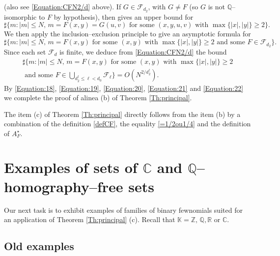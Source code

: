 \documentclass[10pt]{article}
\theoremstyle{definition}
\numberwithin{equation}{section}
\newcommand {\Q}{{\mathbb{Q}}}
\newcommand {\C}{{\mathbb{C}}}
\newcommand {\R}{{\mathbb{R}}}
\newcommand {\Z}{{\mathbb{Z}}}
\newcommand {\K}{{\mathbb{K}}}
\begin{document}
(also see \eqref{Equation:CFN2/d} above). 
If $G \in \mathcal F_{d_2}$, with $G\neq F$ (so $G$ is not $\Q$--isomorphic to $F$ by hypothesis), then \cite[Theorem 1.1]{FW2} gives an upper bound for
\begin{equation}\label{Equation:21}
\sharp \{ m : \vert m \vert \leqslant N, \, m=F(x,y) =G(u,v)\text{ for some } (x,y,u,v) \text{ with } \max \{ \vert x \vert, \vert y \vert \} \geqslant 2\}. \end{equation}
We then apply the inclusion--exclusion principle to give an asymptotic formula for 
\[
\sharp \{ m : \vert m \vert \leqslant N, \, m=F(x,y) \text{ for some } (x,y) \text{ with } \max \{ \vert x \vert, \vert y \vert \} \geqslant 2 \text{ and some } F \in \mathcal F_{d_2}\}.
\]
Since each set $\mathcal F_d$ is finite, we deduce from \eqref{Equation:CFN2/d} the bound 
\begin{equation}\label{Equation:22}
\begin{aligned}
\sharp \{ m : \vert m \vert \leqslant N, \, m=F(x,y) \text{ for some } (x,y) \text{ with } \max \{ \vert x \vert, \vert y \vert \} \geqslant 2\\ \text{ and some } F \in \bigcup_{d_2^\dag \leqslant \ell < d_0}\mathcal F_{\ell}\} =O(N^{2/d_2^\dag}). 
\end{aligned}
\end{equation}
By \eqref{Equation:18}, \eqref{Equation:19}, \eqref{Equation:20}, \eqref{Equation:21} and \eqref{Equation:22} we complete the proof of alinea (b) of Theorem \ref{Th:principal}.
 
 The item (c) of Theorem \ref{Th:principal} directly follows from the item (b) by a combination of the definition \eqref{defCF}, the equality \eqref{=1/2ou1/4} and the definition of $A^\star_F$.
 
 \section{Examples of sets of $\C$ and $\Q$--homography--free sets}\label{Section:Examples}
 
 Our next task is to exhibit examples of families of binary fewnomials suited for an application of Theorem \ref{Th:principal} (c).
Recall that $\K = \Z,\, \Q, \R$ or $\C$. 
\subsection{Old examples}%
\end{document}
